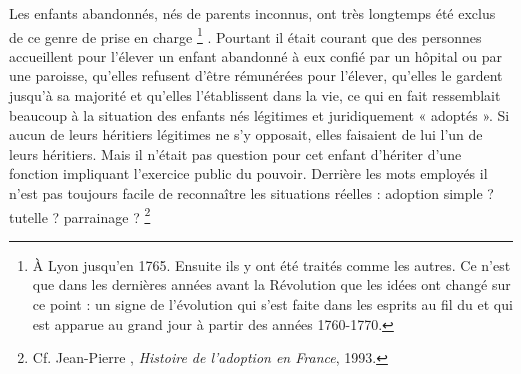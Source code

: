  Les enfants abandonnés, nés de parents inconnus, ont très longtemps été exclus de ce genre de prise en charge%
\footnote{À Lyon jusqu'en 1765. Ensuite ils y ont été traités comme les autres. Ce n'est que dans les dernières années avant la Révolution que les idées ont changé sur ce point : un signe de l'évolution qui s'est faite dans les esprits au fil du  et qui est apparue au grand jour à partir des années 1760-1770.}%
. Pourtant il était courant que des personnes accueillent pour l'élever un enfant abandonné à eux confié par un hôpital ou par une paroisse, qu'elles refusent d'être rémunérées pour l'élever, qu'elles le gardent jusqu'à sa majorité et qu'elles l'établissent dans la vie, ce qui en fait ressemblait beaucoup à la situation des enfants nés légitimes et juridiquement « adoptés ». Si aucun de leurs héritiers légitimes ne s'y opposait, elles faisaient de lui l'un de leurs héritiers. Mais il n'était pas question pour cet enfant d'hériter d'une fonction impliquant l'exercice public du pouvoir. 
 Derrière les mots employés il n'est pas toujours facile de reconnaître les situations réelles : adoption simple ? tutelle ? parrainage ?%
\footnote{Cf. Jean-Pierre , \emph{Histoire de l'adoption en France}, 1993.} 


